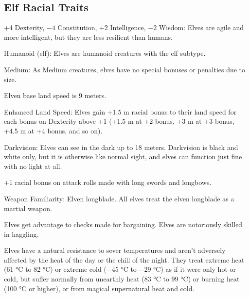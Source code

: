 \subsection{Elf Racial Traits}
\begin{itemize*}
    \item +4 Dexterity, $-4$ Constitution, +2 Intelligence, $-2$ Wisdom: Elves are agile and more intelligent, but they are less resilient than humans.
    \item Humanoid (elf): Elves are humanoid creatures with the elf subtype.
    \item Medium: As Medium creatures, elves have no special bonuses or penalties due to size.
    \item Elven base land speed is 9 meters.
    \item Enhanced Land Speed: Elves gain +1.5 m racial bonus to their land speed for each bonus on Dexterity above +1 (+1.5 m at +2 bonus, +3 m at +3 bonus, +4.5 m at +4 bonus, and so on).
    \item Darkvision: Elves can see in the dark up to 18 meters. Darkvision is black and white only, but it is otherwise like normal sight, and elves can function just fine with no light at all.
    \item +1 racial bonus on attack rolls made with long swords and longbows.
    \item Weapon Familiarity: Elven longblade. All elves treat the elven longblade as a martial weapon.
    \item Elves get advantage to  checks made for bargaining. Elves are notoriously skilled in haggling.
    \item Elves have a natural resistance to sever temperatures and aren't adversely affected by the heat of the day or the chill of the night. They treat extreme heat (61 °C to 82 °C) or extreme cold ($-45$ °C to $-29$ °C) as if it were only hot or cold, but suffer normally from unearthly heat (83 °C to 99 °C) or burning heat (100 °C or higher), or from magical supernatural heat and cold.

\end{itemize*}
